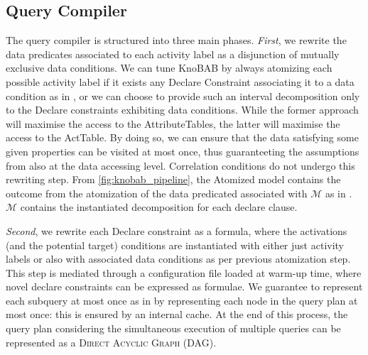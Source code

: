 \subsection{Query Compiler}\label{sec:qc}
The query compiler is structured into three main phases. \textit{First}, we rewrite the data predicates 
associated to each activity label as a 
disjunction of mutually exclusive data conditions. We can tune KnoBAB by always atomizing each possible activity label if it exists any Declare Constraint associating it to a data condition as in \cite{bpm21}, or we can choose to provide such an interval decomposition only to the Declare constraints exhibiting data conditions. While the former approach will maximise the access to the \textsf{AttributeTable}s, the latter will maximise the access to the \textsf{ActTable}. By doing so, we can ensure that the data satisfying some given properties can be visited at most once, thus guaranteeting the assumptions from \cite{BellatrecheKB21} also at the data accessing level. Correlation conditions do not undergo this rewriting step. From \figurename\ref{fig:knobab_pipeline}, the Atomized model contains the outcome from the atomization of the data predicated associated with $\mathcal{M}$ as in \cite{bpm21}. $\mathcal{M}$ contains the instantiated decomposition for each declare clause.

\textit{Second}, we rewrite each Declare constraint as a \xLTLf formula, where the activations (and the potential target) conditions are instantiated with either just activity labels or also with associated data conditions as per previous atomization step. This step is mediated through a configuration file loaded at warm-up time, where novel declare constraints can be expressed as \xLTLf formulae. We guarantee to represent each subquery at most once as in \cite{BellatrecheKB21} by representing each node in the query plan at most once: this is ensured by an internal cache. At the end of this process, the query plan considering the simultaneous execution of multiple queries can be represented as a \textsc{Direct Acyclic Graph} (DAG). 

